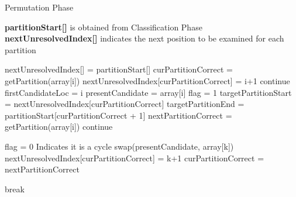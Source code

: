 \begin{algorithm}[h!]
\small
\caption{Permutation Phase}
\label{alg:swap_phase}
\textbf{partitionStart[]} is obtained from Classification Phase\\
\textbf{nextUnresolvedIndex[]} indicates the next position to be examined for each partition\\
\begin{algorithmic}[1]
\State nextUnresolvedIndex[] = partitionStart[]
	\State curPartitionCorrect = getPartition(array[i])
     \State nextUnresolvedIndex[curPartitionCorrect] = i+1
	\State continue
     \Else
     		\State firstCandidateLoc = i
			\State presentCandidate = array[i]             
            \State flag = 1
                \State targetPartitionStart = nextUnresolvedIndex[curPartitionCorrect]
                \State targetPartitionEnd = partitionStart[curPartitionCorrect + 1]
                \State nextPartitionCorrect = getPartition(array[i])
                        \State continue
                        
                        \State flag = 0 \Comment Indicates it is a cycle
                    \EndIf
                    \State swap(presentCandidate, array[k])
                    \State nextUnresolvedIndex[curPartitionCorrect] = k+1
                    \State curPartitionCorrect = nextPartitionCorrect
                    
                    \State break
             
				\EndFor
			\EndWhile
	\EndIf
\EndFor
{}
\end{algorithmic}

\end{algorithm}